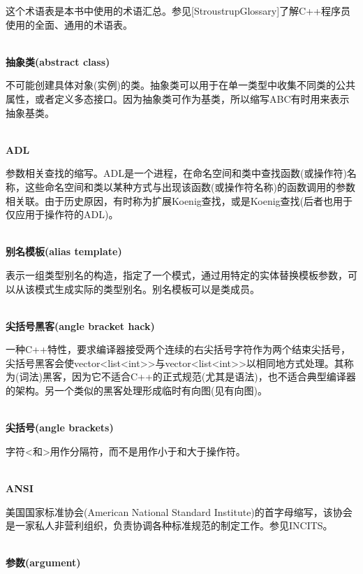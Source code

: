 
这个术语表是本书中使用的术语汇总。参见[StroustrupGlossary]了解C++程序员使用的全面、通用的术语表。

\hspace*{\fill} \\ %
\noindent
\textbf{抽象类(abstract class)}

不可能创建具体对象(实例)的类。抽象类可以用于在单一类型中收集不同类的公共属性，或者定义多态接口。因为抽象类可作为基类，所以缩写ABC有时用来表示抽象基类。

\hspace*{\fill} \\ %
\noindent
\textbf{ADL}

参数相关查找的缩写。ADL是一个进程，在命名空间和类中查找函数(或操作符)名称，这些命名空间和类以某种方式与出现该函数(或操作符名称)的函数调用的参数相关联。由于历史原因，有时称为扩展Koenig查找，或是Koenig查找(后者也用于仅应用于操作符的ADL)。

\hspace*{\fill} \\ %
\noindent
\textbf{别名模板(alias template)}  

表示一组类型别名的构造，指定了一个模式，通过用特定的实体替换模板参数，可以从该模式生成实际的类型别名。别名模板可以是类成员。

\hspace*{\fill} \\ %
\noindent
\textbf{尖括号黑客(angle bracket hack)}

一种C++特性，要求编译器接受两个连续的右尖括号字符作为两个结束尖括号，尖括号黑客会使vector<list<int>{}>与vector<list<int>{}>以相同地方式处理。其称为(词法)黑客，因为它不适合C++的正式规范(尤其是语法)，也不适合典型编译器的架构。另一个类似的黑客处理形成临时有向图(见有向图)。

\hspace*{\fill} \\ %
\noindent
\textbf{尖括号(angle brackets)}

字符<和>用作分隔符，而不是用作小于和大于操作符。

\hspace*{\fill} \\ %
\noindent
\textbf{ANSI}

美国国家标准协会(American National Standard Institute)的首字母缩写，该协会是一家私人非营利组织，负责协调各种标准规范的制定工作。参见INCITS。

\hspace*{\fill} \\ %
\noindent
\textbf{参数(argument)}

